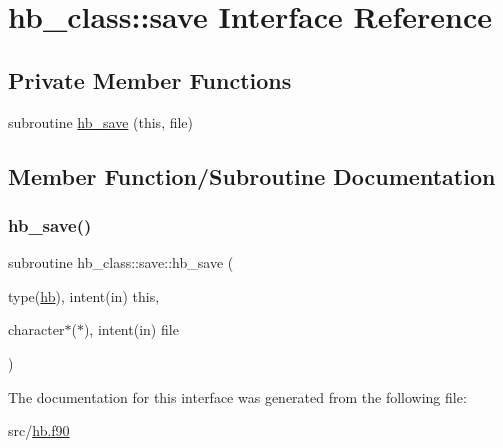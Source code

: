 \hypertarget{interfacehb__class_1_1save}{}\section{hb\+\_\+class\+:\+:save Interface Reference}
\label{interfacehb__class_1_1save}
\subsection*{Private Member Functions}
\begin{DoxyCompactItemize}
\item 
subroutine \hyperlink{interfacehb__class_1_1save_a8b7b0022dec52e2c701980d7b192389b}{hb\+\_\+save} (this, file)
\end{DoxyCompactItemize}


\subsection{Member Function/\+Subroutine Documentation}
\mbox{\label{interfacehb__class_1_1save_a8b7b0022dec52e2c701980d7b192389b}} 
\subsubsection{\texorpdfstring{hb\+\_\+save()}{hb\_save()}}
{\footnotesize\ttfamily subroutine hb\+\_\+class\+::save\+::hb\+\_\+save (\begin{DoxyParamCaption}\item[{type(\hyperlink{structhb__class_1_1hb}{hb}), intent(in)}]{this,  }\item[{character$\ast$($\ast$), intent(in)}]{file }\end{DoxyParamCaption})\hspace{0.3cm}{\ttfamily [private]}}



The documentation for this interface was generated from the following file\+:\begin{DoxyCompactItemize}
\item 
src/\hyperlink{hb_8f90}{hb.\+f90}\end{DoxyCompactItemize}
